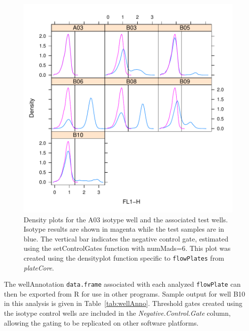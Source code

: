 \documentclass[12pt]{article}
\newcommand{\Robject}[1]{{\texttt{#1}}}
\newcommand{\Rpackage}[1]{{\textit{#1}}}
\begin{document}
\begin{figure}
\centering
\includegraphics{outline-isoGate}
\caption{Density plots for the A03 isotype well and the associated test wells. Isotype results are shown in magenta while the test samples
are in blue. The vertical bar indicates the negative control gate, estimated using the setControlGates function with numMads=6. This
plot was created using the densityplot function specific to \Robject{flowPlates} from \Rpackage{plateCore}.}
\label{fig:isoGate}
\end{figure}

\clearpage
The wellAnnotation \Robject{data.frame} associated with each analyzed \Robject{flowPlate} can then be exported from R for
use in other programs. Sample output for well B10 in this analysis is given in Table~\ref{tab:wellAnno}. Threshold
gates created using the isotype control wells are included in the \emph{Negative.Control.Gate} column, allowing the gating to be replicated on other
software platforms.
\end{document}
